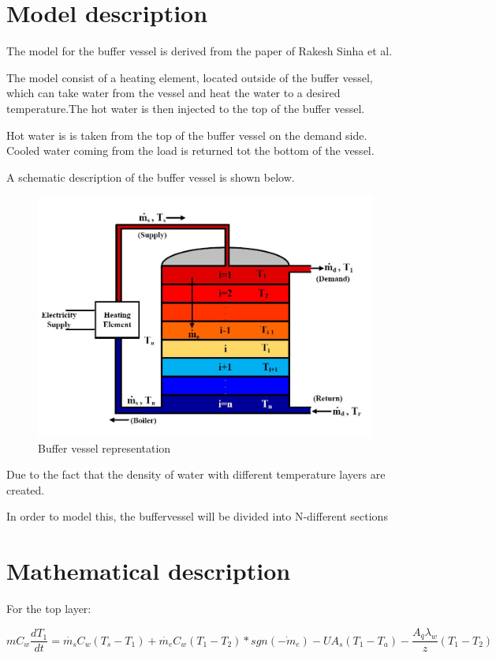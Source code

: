 \section{Model description}

The model for the buffer vessel is derived from the paper of Rakesh Sinha et al. \cite{}

The model consist of a heating element, located outside of the buffer vessel, which can take water from the vessel and heat the water to a desired temperature.The hot water is then injected to the top of the buffer vessel. 

Hot water is is taken from the top of the buffer vessel on the demand side. Cooled water coming from the load is returned tot the bottom of the vessel.

A schematic description of the buffer vessel is shown below.

\begin{figure}[H]
	\centering
	\includegraphics[width=0.8\columnwidth]{Pictures/buffervessel_setup.JPG}
	\caption[Short title]{Buffer vessel representation}
\end{figure}

Due to the fact that the density of water with different temperature layers are created.

In order to model this, the buffervessel will be divided into N-different sections 


\section{Mathematical description}


For the top layer:

\begin{equation}
	\label{eq:Buffer vessel top layer}
	mC_w \dfrac{dT_1}{dt} = \dot{m_s}C_w(T_s - T_1) + \dot{m_e}C_w(T_1 - T_2)*sgn(\dot{-m_e}) - UA_s(T_1 - T_a) - \frac{A_q\lambda_w}{z}(T_1-T_2)
\end{equation}

